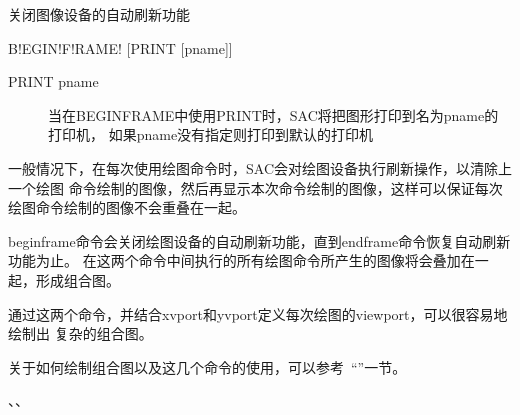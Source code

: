 \label{cmd:beginframe}

关闭图像设备的自动刷新功能

\begin{SACSTX}
B!EGIN!F!RAME! [PRINT [pname]]
\end{SACSTX}

\begin{description}
\item [PRINT pname] 当在BEGINFRAME中使用PRINT时，SAC将把图形打印到名为pname的打印机，
    如果pname没有指定则打印到默认的打印机
\end{description}

一般情况下，在每次使用绘图命令时，SAC会对绘图设备执行刷新操作，以清除上一个绘图
命令绘制的图像，然后再显示本次命令绘制的图像，这样可以保证每次绘图命令绘制的图像不会重叠在一起。

beginframe命令会关闭绘图设备的自动刷新功能，直到endframe命令恢复自动刷新功能为止。
在这两个命令中间执行的所有绘图命令所产生的图像将会叠加在一起，形成组合图。

通过这两个命令，并结合xvport和yvport定义每次绘图的viewport，可以很容易地绘制出
复杂的组合图。

关于如何绘制组合图以及这几个命令的使用，可以参考~``''一节。

、、
